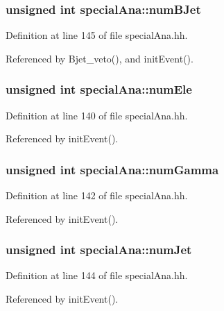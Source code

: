 \subsubsection[{num\-B\-Jet}]{\setlength{\rightskip}{0pt plus 5cm}unsigned int special\-Ana\-::num\-B\-Jet}\label{classspecialAna_af82a39567ee3dd6a4e5f5bfd439e3945}


Definition at line 145 of file special\-Ana.\-hh.



Referenced by Bjet\-\_\-veto(), and init\-Event().

\subsubsection[{num\-Ele}]{\setlength{\rightskip}{0pt plus 5cm}unsigned int special\-Ana\-::num\-Ele}\label{classspecialAna_a11b4167816b835bd2a729ebde0dc1098}


Definition at line 140 of file special\-Ana.\-hh.



Referenced by init\-Event().

\subsubsection[{num\-Gamma}]{\setlength{\rightskip}{0pt plus 5cm}unsigned int special\-Ana\-::num\-Gamma}\label{classspecialAna_a76c852b99af4a8890ab656c041fba8af}


Definition at line 142 of file special\-Ana.\-hh.



Referenced by init\-Event().

\subsubsection[{num\-Jet}]{\setlength{\rightskip}{0pt plus 5cm}unsigned int special\-Ana\-::num\-Jet}\label{classspecialAna_aa2601aeefa3374b37708442a41f9d876}


Definition at line 144 of file special\-Ana.\-hh.



Referenced by init\-Event().

